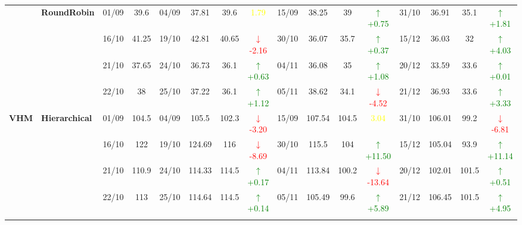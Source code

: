 \documentclass{ieeeaccess}
\begin{document}
{\begin{longtable}{llcc|cccc|cccc|cccc}
& \textbf{RoundRobin}
& 01/09 & 39.6 & 04/09 & 37.81 & 39.6 & \textcolor{yellow}{1.79} & 15/09 & 38.25 & 39 & \textcolor{green}{\(\uparrow\)+0.75} & 31/10 & 36.91 & 35.1 & \textcolor{green}{\(\uparrow\)+1.81} \\

&
& 16/10 & 41.25 & 19/10 & 42.81 & 40.65 & \textcolor{red}{\(\downarrow\)-2.16} & 30/10 & 36.07 & 35.7 & \textcolor{green}{\(\uparrow\)+0.37} & 15/12 & 36.03 & 32 & \textcolor{green}{\(\uparrow\)+4.03} \\

&
& 21/10 & 37.65 & 24/10 & 36.73 & 36.1 & \textcolor{green}{\(\uparrow\)+0.63} & 04/11 & 36.08 & 35 & \textcolor{green}{\(\uparrow\)+1.08} & 20/12 & 33.59 & 33.6 & \textcolor{green}{\(\uparrow\)+0.01} \\

&
& 22/10 & 38 & 25/10 & 37.22 & 36.1 & \textcolor{green}{\(\uparrow\)+1.12} & 05/11 & 38.62 & 34.1 & \textcolor{red}{\(\downarrow\)-4.52} & 21/12 & 36.93 & 33.6 & \textcolor{green}{\(\uparrow\)+3.33} \\
\midrule




\multirow{12}{*}{\textbf{VHM}} 
& \textbf{Hierarchical}
& 01/09 & 104.5 & 04/09 & 105.5 & 102.3 & \textcolor{red}{\(\downarrow\)-3.20} & 15/09 & 107.54 & 104.5 & \textcolor{yellow}{3.04} & 31/10 & 106.01 & 99.2 & \textcolor{red}{\(\downarrow\)-6.81} \\

&
& 16/10 & 122 & 19/10 & 124.69 & 116 & \textcolor{red}{\(\downarrow\)-8.69} & 30/10 & 115.5 & 104 & \textcolor{green}{\(\uparrow\)+11.50} & 15/12 & 105.04 & 93.9 & \textcolor{green}{\(\uparrow\)+11.14} \\

&
& 21/10 & 110.9 & 24/10 & 114.33 & 114.5 & \textcolor{green}{\(\uparrow\)+0.17} & 04/11 & 113.84 & 100.2 & \textcolor{red}{\(\downarrow\)-13.64} & 20/12 & 102.01 & 101.5 & \textcolor{green}{\(\uparrow\)+0.51} \\

&
& 22/10 & 113 & 25/10 & 114.64 & 114.5 & \textcolor{green}{\(\uparrow\)+0.14} & 05/11 & 105.49 & 99.6 & \textcolor{green}{\(\uparrow\)+5.89} & 21/12 & 106.45 & 101.5 & \textcolor{green}{\(\uparrow\)+4.95} \\
\cmidrule(lr){2-16}



\end{longtable}}
\end{document}
